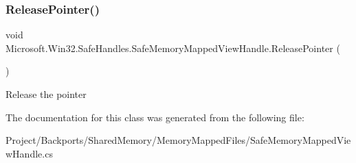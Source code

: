 \subsubsection{\texorpdfstring{Release\+Pointer()}{ReleasePointer()}}
{\footnotesize\ttfamily void Microsoft.\+Win32.\+Safe\+Handles.\+Safe\+Memory\+Mapped\+View\+Handle.\+Release\+Pointer (\begin{DoxyParamCaption}{ }\end{DoxyParamCaption})\hspace{0.3cm}{\ttfamily [inline]}}



Release the pointer 



The documentation for this class was generated from the following file\+:\begin{DoxyCompactItemize}
\item 
Project/\+Backports/\+Shared\+Memory/\+Memory\+Mapped\+Files/Safe\+Memory\+Mapped\+View\+Handle.\+cs\end{DoxyCompactItemize}
